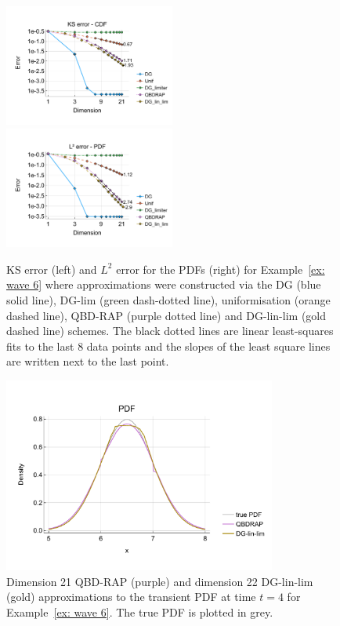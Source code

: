 \begin{example}
\begin{figure}[h]
		\label{fig: fun 6 wave cp} 
	\end{figure}
	\begin{figure}[h]
		\centering
		\includegraphics[width=0.5\textwidth,trim={0.75cm 0.8cm 0.25cm 1.25cm},clip]{chapter6/figs/wave/fun6/meshs_ks_error_formatted.pdf}%
		\includegraphics[width=0.5\textwidth,trim={0.75cm 0.8cm 0.25cm 1.25cm},clip]{chapter6/figs/wave/fun6/meshs_l2_pdf_error_formatted.pdf}
		\caption{KS error (left) and \(L^2\) error for the PDFs (right) for Example~\ref{ex: wave 6} where approximations were constructed via the DG (blue solid line), DG-lim (green dash-dotted line), uniformisation (orange dashed line), QBD-RAP (purple dotted line) and DG-lin-lim (gold dashed line) schemes. The black dotted lines are linear least-squares fits to the last 8 data points and the slopes of the least square lines are written next to the last point.} 
		\label{fig: fun 6 wave} 
	\end{figure}
	\begin{figure}[h]
		\centering
		\includegraphics[width=0.8\textwidth,trim={0cm 1.25cm 0cm 1.25cm},clip]{chapter6/figs/wave/fun6/order_21_PDFs_formatted.pdf}
		\caption{Dimension 21 QBD-RAP (purple) and dimension 22 DG-lin-lim (gold) approximations to the transient PDF at time \(t=4\) for Example~\ref{ex: wave 6}. The true PDF is plotted in grey.}  
		\label{fig: fun 6 wave pdfs} 
	\end{figure}
\exampleFloatBarrier
\end{example}

